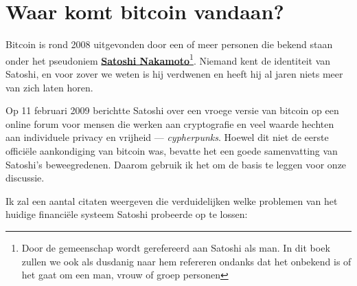 \documentclass[
  letterpaper,
]{scrbook}
\begin{document}
\hypertarget{waar-komt-bitcoin-vandaan}{%
\section{Waar komt bitcoin vandaan?}\label{waar-komt-bitcoin-vandaan}}

Bitcoin is rond 2008 uitgevonden door een of meer personen die bekend
staan onder het pseudoniem
\href{https://nl.wikipedia.org/wiki/Satoshi_Nakamoto}{\textbf{Satoshi
Nakamoto}}\footnote{Door de gemeenschap wordt gerefereerd aan Satoshi
  als man. In dit boek zullen we ook als dusdanig naar hem refereren
  ondanks dat het onbekend is of het gaat om een man, vrouw of groep
  personen}. Niemand kent de identiteit van Satoshi, en voor zover we
weten is hij verdwenen en heeft hij al jaren niets meer van zich laten
horen.

Op 11 februari 2009 berichtte Satoshi over een vroege versie van bitcoin
op een online forum voor mensen die werken aan cryptografie en veel
waarde hechten aan individuele privacy en vrijheid ---
\emph{cypherpunks}. Hoewel dit niet de eerste officiële aankondiging van
bitcoin was, bevatte het een goede samenvatting van Satoshi's
beweegredenen. Daarom gebruik ik het om de basis te leggen voor onze
discussie.

Ik zal een aantal citaten weergeven die verduidelijken welke problemen
van het huidige financiële systeem Satoshi probeerde op te lossen:
\end{document}
